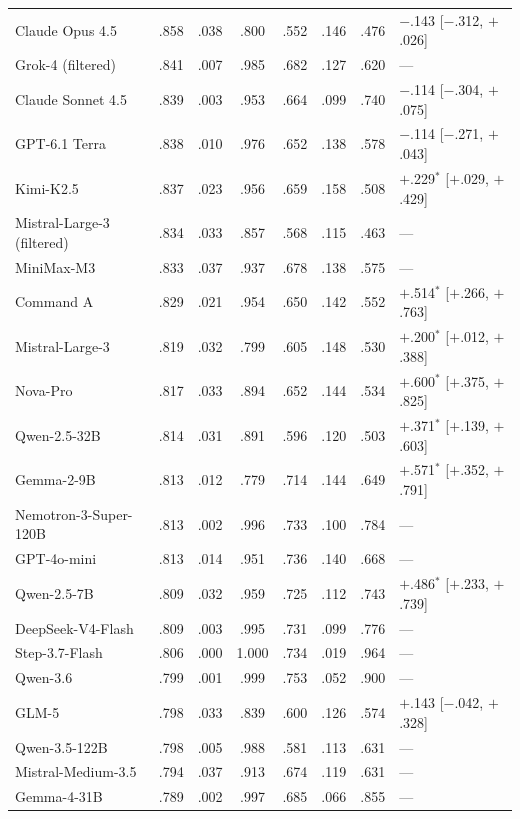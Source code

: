\begin{table}[t]
\begin{tabular}{@{}lccccccl@{}}
Claude Opus 4.5 & .858 & .038 & .800 & .552 & .146 & .476 & $-$.143 [$-$.312, $+$.026] \\
Grok-4 (filtered) & .841 & .007 & .985 & .682 & .127 & .620 & --- \\
Claude Sonnet 4.5 & .839 & .003 & .953 & .664 & .099 & .740 & $-$.114 [$-$.304, $+$.075] \\
GPT-6.1 Terra & .838 & .010 & .976 & .652 & .138 & .578 & $-$.114 [$-$.271, $+$.043] \\
Kimi-K2.5 & .837 & .023 & .956 & .659 & .158 & .508 & $+$.229$^{*}$ [$+$.029, $+$.429] \\
Mistral-Large-3 (filtered) & .834 & .033 & .857 & .568 & .115 & .463 & --- \\
MiniMax-M3 & .833 & .037 & .937 & .678 & .138 & .575 & --- \\
Command A & .829 & .021 & .954 & .650 & .142 & .552 & $+$.514$^{*}$ [$+$.266, $+$.763] \\
Mistral-Large-3 & .819 & .032 & .799 & .605 & .148 & .530 & $+$.200$^{*}$ [$+$.012, $+$.388] \\
Nova-Pro & .817 & .033 & .894 & .652 & .144 & .534 & $+$.600$^{*}$ [$+$.375, $+$.825] \\
Qwen-2.5-32B & .814 & .031 & .891 & .596 & .120 & .503 & $+$.371$^{*}$ [$+$.139, $+$.603] \\
Gemma-2-9B & .813 & .012 & .779 & .714 & .144 & .649 & $+$.571$^{*}$ [$+$.352, $+$.791] \\
Nemotron-3-Super-120B & .813 & .002 & .996 & .733 & .100 & .784 & --- \\
GPT-4o-mini & .813 & .014 & .951 & .736 & .140 & .668 & --- \\
Qwen-2.5-7B & .809 & .032 & .959 & .725 & .112 & .743 & $+$.486$^{*}$ [$+$.233, $+$.739] \\
DeepSeek-V4-Flash & .809 & .003 & .995 & .731 & .099 & .776 & --- \\
Step-3.7-Flash & .806 & .000 & 1.000 & .734 & .019 & .964 & --- \\
Qwen-3.6 & .799 & .001 & .999 & .753 & .052 & .900 & --- \\
GLM-5 & .798 & .033 & .839 & .600 & .126 & .574 & $+$.143 [$-$.042, $+$.328] \\
Qwen-3.5-122B & .798 & .005 & .988 & .581 & .113 & .631 & --- \\
Mistral-Medium-3.5 & .794 & .037 & .913 & .674 & .119 & .631 & --- \\
Gemma-4-31B & .789 & .002 & .997 & .685 & .066 & .855 & --- \\

\end{tabular}
\end{table}
